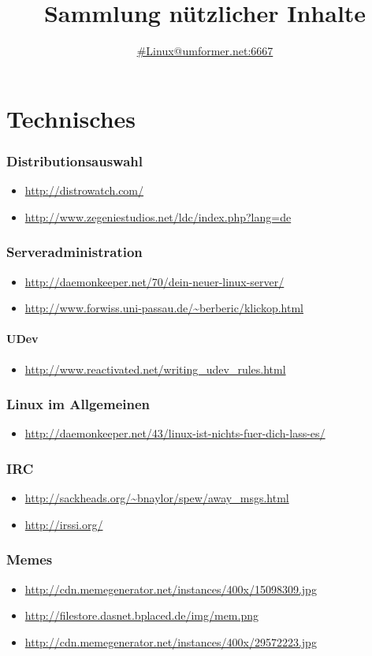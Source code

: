 \documentclass[oneside,12pt,a4paper]{scrartcl}
\title{Sammlung nützlicher Inhalte}
\author{\href{http://chat.mibbit.com/?channel=\%23linux\&nick=your_nick_here\&server=umformer.net\&autoConnect=true}{\#Linux@umformer.net:6667}}
\newcommand{\linkitem}[1]{\item \url{#1}}
\begin{document}
\maketitle

\tableofcontents
\clearpage

\part{Technisches}
\section{Distributionsauswahl}
\begin{itemize}
\linkitem{http://distrowatch.com/}
\linkitem{http://www.zegeniestudios.net/ldc/index.php?lang=de}
\end{itemize}


\section{Serveradministration}
\begin{itemize}
\linkitem{http://daemonkeeper.net/70/dein-neuer-linux-server/}
\linkitem{http://www.forwiss.uni-passau.de/~berberic/klickop.html}
\end{itemize}
	\subsection{UDev}
	\begin{itemize}
	\linkitem{http://www.reactivated.net/writing_udev_rules.html}
	\end{itemize}

\section{Linux im Allgemeinen}
\begin{itemize}
\linkitem{http://daemonkeeper.net/43/linux-ist-nichts-fuer-dich-lass-es/}
\end{itemize}

\section{IRC}
\begin{itemize}
\linkitem{http://sackheads.org/~bnaylor/spew/away_msgs.html}
\linkitem{http://irssi.org/}
\end{itemize}

\section{Memes}
\begin{itemize}
\linkitem{http://cdn.memegenerator.net/instances/400x/15098309.jpg}
\linkitem{http://filestore.dasnet.bplaced.de/img/mem.png}
\linkitem{http://cdn.memegenerator.net/instances/400x/29572223.jpg}
\end{itemize}
\end{document}

